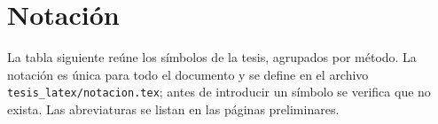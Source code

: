\chapter{Notación}
\label{ap:notacion}

La tabla siguiente reúne los símbolos de la tesis, agrupados por método. La notación es única para
todo el documento y se define en el archivo \texttt{tesis\_latex/notacion.tex}; antes de
introducir un símbolo se verifica que no exista. Las abreviaturas se listan en las páginas
preliminares.

\listadesimbolos





